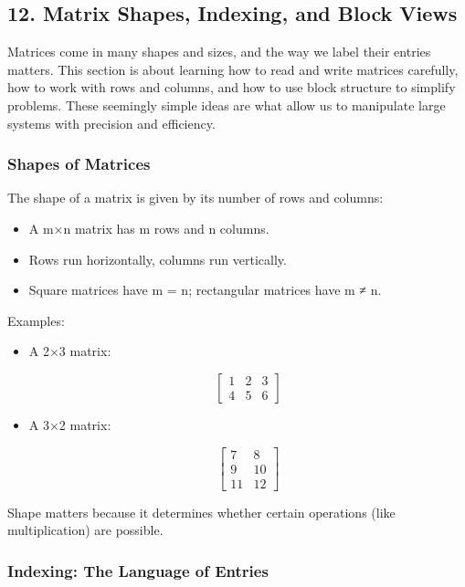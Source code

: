 \documentclass[
  letterpaper,
  DIV=11,
  numbers=noendperiod]{scrreprt}
\providecommand{\tightlist}{%
  \setlength{\itemsep}{0pt}\setlength{\parskip}{0pt}}
\begin{document}
\subsection{12. Matrix Shapes, Indexing, and Block
Views}\label{matrix-shapes-indexing-and-block-views}

Matrices come in many shapes and sizes, and the way we label their
entries matters. This section is about learning how to read and write
matrices carefully, how to work with rows and columns, and how to use
block structure to simplify problems. These seemingly simple ideas are
what allow us to manipulate large systems with precision and efficiency.

\subsubsection{Shapes of Matrices}\label{shapes-of-matrices}

The shape of a matrix is given by its number of rows and columns:

\begin{itemize}
\tightlist
\item
  A m×n matrix has m rows and n columns.
\item
  Rows run horizontally, columns run vertically.
\item
  Square matrices have m = n; rectangular matrices have m ≠ n.
\end{itemize}

Examples:

\begin{itemize}
\item
  A 2×3 matrix:

  \[
  \begin{bmatrix} 
  1 & 2 & 3 \\ 
  4 & 5 & 6 
  \end{bmatrix}
  \]
\item
  A 3×2 matrix:

  \[
  \begin{bmatrix} 
  7 & 8 \\ 
  9 & 10 \\ 
  11 & 12 
  \end{bmatrix}
  \]
\end{itemize}

Shape matters because it determines whether certain operations (like
multiplication) are possible.

\subsubsection{Indexing: The Language of
Entries}\label{indexing-the-language-of-entries}
\end{document}
